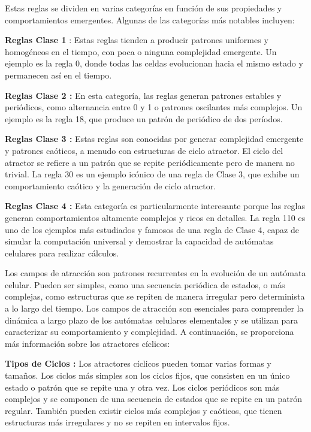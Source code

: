 \documentclass{article}
\begin{document}
	Estas reglas se dividen en varias categorías en función de sus propiedades y comportamientos emergentes. Algunas de las categorías más notables incluyen:
	
	\textbf{Reglas Clase 1} : Estas reglas tienden a producir patrones uniformes y homogéneos en el tiempo, con poca o ninguna complejidad emergente. Un ejemplo es la regla 0, donde todas las celdas evolucionan hacia el mismo estado y permanecen así en el tiempo.
	
	\textbf{Reglas Clase 2 :} En esta categoría, las reglas generan patrones estables y periódicos, como alternancia entre 0 y 1 o patrones oscilantes más complejos. Un ejemplo es la regla 18, que produce un patrón de periódico de dos períodos.
	
	\textbf{Reglas Clase 3 :} Estas reglas son conocidas por generar complejidad emergente y patrones caóticos, a menudo con estructuras de ciclo atractor. El ciclo del atractor se refiere a un patrón que se repite periódicamente pero de manera no trivial. La regla 30 es un ejemplo icónico de una regla de Clase 3, que exhibe un comportamiento caótico y la generación de ciclo atractor.
	
	\textbf{Reglas Clase 4 :} Esta categoría es particularmente interesante porque las reglas generan comportamientos altamente complejos y ricos en detalles. La regla 110 es uno de los ejemplos más estudiados y famosos de una regla de Clase 4, capaz de simular la computación universal y demostrar la capacidad de autómatas celulares para realizar cálculos.
	
	
	Los campos de atracción son patrones recurrentes en la evolución de un autómata celular. Pueden ser simples, como una secuencia periódica de estados, o más complejas, como estructuras que se repiten de manera irregular pero determinista a lo largo del tiempo. Los campos de atracción son esenciales para comprender la dinámica a largo plazo de los autómatas celulares elementales y se utilizan para caracterizar su comportamiento y complejidad.
	A continuación, se proporciona más información sobre los atractores cíclicos:
	
	\textbf{Tipos de Ciclos :} Los atractores cíclicos pueden tomar varias formas y tamaños. Los ciclos más simples son los ciclos fijos, que consisten en un único estado o patrón que se repite una y otra vez. Los ciclos periódicos son más complejos y se componen de una secuencia de estados que se repite en un patrón regular. También pueden existir ciclos más complejos y caóticos, que tienen estructuras más irregulares y no se repiten en intervalos fijos.
	
\end{document}
